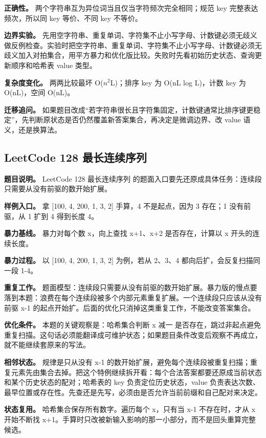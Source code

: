 \textbf{正确性。} 两个字符串互为异位词当且仅当字符频次完全相同；规范 key 完整表达频次，所以同 key 等价、不同 key 不等价。

\textbf{边界实验。} 先用空字符串、重复单词、字符集不止小写字母、计数键必须无歧义做反例检查。实验时把空字符串、重复单词、字符集不止小写字母、计数键必须无歧义加入对拍集合，用平方暴力和优化版比较。失败时先看初始历史状态、查询更新顺序和哈希表 value 类型。

\textbf{复杂度变化。} 两两比较最坏 O(\ensuremath{n^{2}}L)；排序 key 为 O(nL log L)，计数 key 为 O(nL)，空间 O(nL)。

\textbf{迁移追问。} 如果题目改成“若字符串很长且字符集固定，计数键通常比排序键更稳定”，先判断原状态是否仍然覆盖新答案集合，再决定是微调边界、改 value 语义，还是换算法。

\subsection{LeetCode 128 最长连续序列}

\textbf{题目说明。} LeetCode 128 最长连续序列 的题面入口要先还原成具体任务：连续段只需要从没有前驱的数开始扩展。

\textbf{样例入口。} 拿 [100, 4, 200, 1, 3, 2] 手算，4 不是起点，因为 3 存在；1 没有前驱，从 1 扩到 4 得到长度 4。

\textbf{暴力基线。} 暴力对每个数 x，向上查找 x+1、x+2 是否存在，计算以 x 开头的连续长度。

\textbf{暴力过程。} 以 [100, 4, 200, 1, 3, 2] 为例，若从 2、3、4 都向后扩，会反复扫描同一段 1-4。

\textbf{重复工作。} 题面模型：连续段只需要从没有前驱的数开始扩展。暴力版的慢点要落到本题：浪费在每个连续段被多个内部元素重复扩展。一个连续段只应该从没有前驱 x-1 的起点开始扩。后面的优化只消掉这类重复工作，不能改变答案集合。

\textbf{优化条件。} 本题的关键观察是：哈希集合判断 x 减一 是否存在，跳过非起点避免重复扫描。这句话必须能翻译成可维护状态；如果题目条件改变后观察不再成立，就不能继续套原来的写法。

\textbf{相邻状态。} 规律是只从没有 x-1 的数开始扩展，避免每个连续段被重复扫描；重复元素先由集合去掉。把这个特例继续拆开看：每个合法答案都要还原成当前状态和某个历史状态的配对；哈希表的 key 负责定位历史状态，value 负责表达次数、最早位置或存在性。先查还是先写，必须由是否允许当前前缀和自己配对来决定。

\textbf{状态复用。} 哈希集合保存所有数字。遍历每个 x，只有当 x-1 不存在时，才从 x 开始不断找 x+1。手算时只改被新输入影响的那一小部分，而不是回头重算完整候选。

